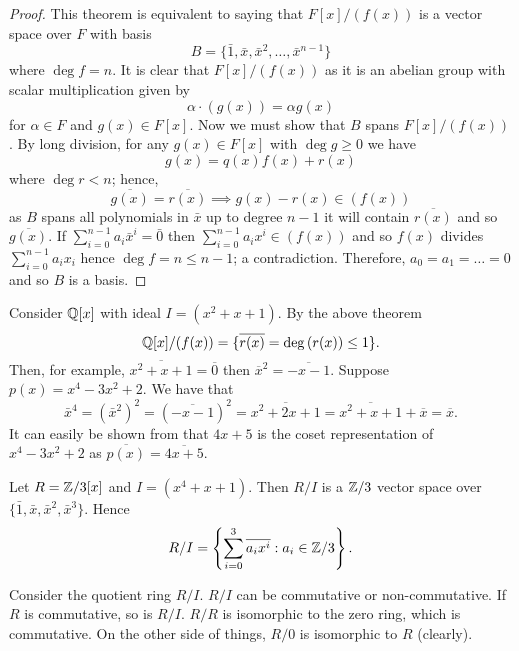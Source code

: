 
\begin{proof}
    This theorem is equivalent to saying that
    $F[x]/(f(x))$
    is a vector space over $F$ with basis
    \[ B = \{ \bar 1, \bar x, \bar x^2, \ldots, \bar x^{n -1} \} \]
    where $\deg f = n$.
    It is clear that $F[x]/(f(x))$ as it is an abelian group
    with scalar multiplication given by
    \[ \alpha \cdot (g(x)) = \alpha g(x) \]
    for $\alpha \in F$ and $g(x) \in F[x]$.
    Now we must show that $B$ spans $F[x]/(f(x))$.
    By long division, for any
    $g(x) \in F[x]$
    with
    $\deg g \geq 0$ we have
    \[ g(x) = q(x)f(x) + r(x) \]
    where $\deg r < n$;
    hence,
    \[ \overline{g(x)} = \overline{r(x)} \implies 
    g(x) - r(x) \in (f(x)) \]
    as $B$ spans all polynomials in $\bar x$ up to degree $n - 1$
    it will contain $\overline{r(x)}$ and so $\overline{g(x)}$.
    If
    $\sum_{i = 0}^{n - 1} a_i \bar x^i = \bar 0$
    then
    $\sum_{i = 0}^{n - 1} a_i x^i \in (f(x))$
    and so $f(x)$ divides
    $\sum_{i = 0}^{n - 1} a_i x_i$
    hence $\deg f = n \leq n - 1$;
    a contradiction. Therefore, $a_0 = a_1 = \ldots = 0$
    and so $B$ is a basis.
\end{proof}

\begin{example}
    Consider $\mathbb{Q}[x]$ with ideal $I = (x^2 + x + 1)$.
    By the above theorem
    \[ \mathbb{Q}[x]/(f(x)) = \{ \overline{r(x)} = \deg{(r(x))} \leq 1 \}. \]
    Then, for example, 
    $\overline{x^2 + x + 1} = \overline 0$
    then
    $\overline x^2 = \overline{-x-1}$.
    Suppose $p(x) = x^4 - 3x^2 + 2$. 
    We have that
    \[ \bar x^4 = 
    (\bar x^2)^2 = 
    (\overline{-x-1})^2 = 
    \overline{x^2 + 2x + 1} =
    \overline{x^2 + x + 1} + \overline x = \overline x. \]
    It can easily be shown from that 
    $4x + 5$ 
    is the coset representation of 
    $x^4 - 3x^2 + 2$
    as $\overline{p(x)} = \overline{4x + 5}$.
\end{example}

\begin{example}
    Let $R = \mathbb{Z}/3[x]$ and $I = (x^4 + x + 1)$. 
    Then $R/I$ is a $\mathbb{Z}/3$ vector space over 
    $\{\bar 1, \bar x, \bar x^2, \bar x^3\}$.
    Hence
    \[ R / I = 
    \left\{ \sum_{i = 0}^3 \overline{a_ix^i} : a_i \in \mathbb{Z}/3 \right\}. 
    \]
\end{example}

\begin{remark}
    Consider the quotient ring $R/I$. 
    $R/I$ can be commutative or non-commutative. 
    If $R$ is commutative, so is $R/I$.
    $R/R$ is isomorphic to the zero ring,
    which is commutative.
    On the other side of things, $R/0$ is isomorphic to $R$ (clearly).
\end{remark}

